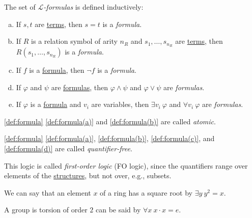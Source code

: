 \begin{definition}[Formula]\label{def:formula}
	The set of \emph{\(\mathcal{L} \)-formulas} is defined inductively:
	\begin{enumerate}[(a)]
		\item\label{def:formula(a)} If \(s, t\) are \hyperref[def:term]{terms}, then \(s=t\) is a \emph{formula}.
		\item\label{def:formula(b)} If \(R\) is a relation symbol of arity \(n_R\) and \(s_1, \dots , s_{n_R}\) are \hyperref[def:term]{terms}, then \(R(s_1, \dots , s_{n_R})\) is a \emph{formula}.
		\item\label{def:formula(c)} If \(f\) is a \hyperref[def:formula]{formula}, then \(\lnot f\) is a \emph{formula}.
		\item\label{def:formula(d)} If \(\varphi\) and \(\psi\) are \hyperref[def:formula]{formulas}, then \(\varphi \land \psi \) and \(\varphi \lor \psi \) are \emph{formulas}.
		\item\label{def:formula(e)} If \(\varphi \) is a \hyperref[def:formula]{formula} and \(v_i\) are variables, then \(\exists v_i \ \varphi \) and \(\forall v_i \ \varphi \) are \emph{formulas}.
	\end{enumerate}
\end{definition}

\begin{notation}[Atomic]\label{not:atomic}
	\autoref{def:formula} \autoref{def:formula(a)} and \autoref{def:formula(b)} are called \emph{atomic}.
\end{notation}

\begin{notation}\label{not:quantifier-free}
	\autoref{def:formula} \autoref{def:formula(a)}, \autoref{def:formula(b)}, \autoref{def:formula(c)}, and \autoref{def:formula(d)} are called \emph{quantifier-free}.
\end{notation}

This logic is called \emph{first-order logic} (FO logic), since the quantifiers range over elements of the \hyperref[def:structure]{structures}, but not over, e.g., subsets.

\begin{eg}
	We can say that an element \(x\) of a ring has a square root by \(\exists y\ y^2 = x\).
\end{eg}

\begin{eg}
	A group is torsion of order \(2\) can be said by \(\forall x\ x\cdot x = e\).
\end{eg}

